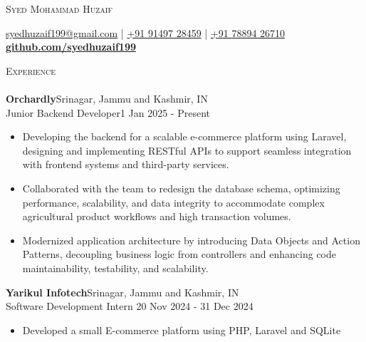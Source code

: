 \documentclass[a4paper]{article}
\newcommand{\lineunder} {
    \vspace*{-8pt} \\
    \hspace*{-18pt} \hrulefill \\
}
\newcommand{\header} [1] {
    {\hspace*{-18pt}\vspace*{6pt} \textsc{#1}}
    \vspace*{-6pt} \lineunder
}
\begin{document}
    \vspace*{-40pt}

    

%
%
  \vspace*{-2pt}
  \begin{center}
    {\Huge \scshape {Syed Mohammad Huzaif}}\\
    \vspace*{2pt}
    
    \vspace*{2pt}
    \href{mailto:syedhuzaif199@gmail.com}{syedhuzaif199@gmail.com} | \href{tel:+919149728459}{+91 91497 28459} | \href{tel:+917889426710}{+91 78894 26710}\\
    \vspace*{2pt}
    \textbf{\href{https://github.com/syedhuzaif199}{github.com/syedhuzaif199}}
  \end{center}

      \header{Experience}
    \vspace{2mm}
        \textbf{Orchardly}\hfill Srinagar, Jammu and Kashmir, IN\\
    Junior Backend Developer\hfill 1 Jan 2025 - Present\\
    \vspace{-2mm}
    \begin{itemize}
    \item[] Developing the backend for a scalable e-commerce platform using Laravel, designing and implementing RESTful APIs to support seamless integration with frontend systems and third-party services.

    \item[] Collaborated with the team to redesign the database schema, optimizing performance, scalability, and data integrity to accommodate complex agricultural product workflows and high transaction volumes.

    \item[] Modernized application architecture by introducing Data Objects and Action Patterns, decoupling business logic from controllers and enhancing code maintainability, testability, and scalability.
    \end{itemize}
      \vspace{2mm}
      \textbf{Yarikul Infotech}\hfill Srinagar, Jammu and Kashmir, IN\\
    Software Development Intern \hfill 20 Nov 2024 - 31 Dec 2024\\
    \vspace{-2mm}
    \begin{itemize}
    \item[] Developed a small E-commerce platform using PHP, Laravel and SQLite
    \end{itemize}
\end{document}
